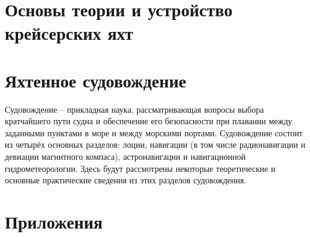 \documentclass[a4paper, 12pt, twoside, final, book, russian, fittopage, cyremdash, openright]{ncc}
\begin{document}
\part{Основы теории и устройство крейсерских яхт}






\part{Яхтенное судовождение}

Судовождение \--- прикладная наука, рассматривающая вопросы выбора
кратчайшего пути судна и обеспечение его безопасности при плавании
между заданными пунктами в море и между морскими портами. Судовождение
состоит из четырёх основных разделов: лоции, навигации (в том числе
радионавигации и девиации магнитного компаса), астронавигации и
навигационной гидрометеорологии. Здесь будут рассмотрены некоторые
теоретические и основные практические сведения из этих разделов
судовождения.








\part{Приложения}







\printindex
\end{document}
